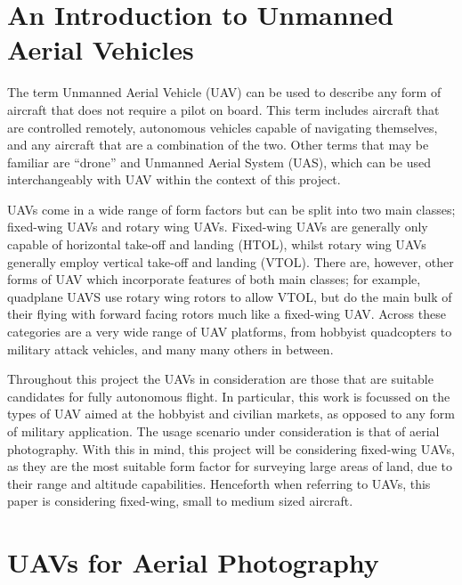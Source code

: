 \section{An Introduction to Unmanned Aerial Vehicles} 
\label{intro:UAVs}

The term Unmanned Aerial Vehicle (UAV) can be used to describe any form of aircraft that does not require a pilot on board. This term includes aircraft that are controlled remotely, autonomous vehicles capable of navigating themselves, and any aircraft that are a combination of the two. Other terms that may be familiar are ``drone'' and Unmanned Aerial System (UAS), which can be used interchangeably with UAV within the context of this project. 

UAVs come in a wide range of form factors but can be split into two main classes; fixed-wing UAVs and rotary wing UAVs. Fixed-wing UAVs are generally only capable of horizontal take-off and landing (HTOL), whilst rotary wing UAVs generally employ vertical take-off and landing (VTOL). There are, however, other forms of UAV which incorporate features of both main classes; for example, quadplane UAVS use rotary wing rotors to allow VTOL, but do the main bulk of their flying with forward facing rotors much like a fixed-wing UAV. Across these categories are a very wide range of UAV platforms, from hobbyist quadcopters to military attack vehicles, and many many others in between.

Throughout this project the UAVs in consideration are those that are suitable candidates for fully autonomous flight. In particular, this work is focussed on the types of UAV aimed at the hobbyist and civilian markets, as opposed to any form of military application. The usage scenario under consideration is that of aerial photography. With this in mind, this project will be considering fixed-wing UAVs, as they are the most suitable form factor for surveying large areas of land, due to their range and altitude capabilities. Henceforth when referring to UAVs, this paper is considering fixed-wing, small to medium sized aircraft. 
 

\section{UAVs for Aerial Photography} 
\label{intro:photography}

